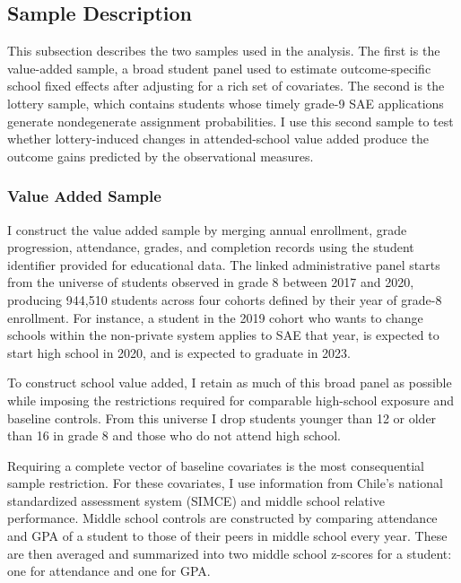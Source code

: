 \documentclass[a4paper, article, english, oneside, unknownkeysallowed, 12pt]{memoir}
\begin{document}
\subsection{Sample Description}

This subsection describes the two samples used in the analysis.
The first is the value-added sample, a broad student panel used to estimate outcome-specific school fixed effects after adjusting for a rich set of covariates.
The second is the lottery sample, which contains students whose timely grade-9 SAE applications generate nondegenerate assignment probabilities.
I use this second sample to test whether lottery-induced changes in attended-school value added produce the outcome gains predicted by the observational measures.


\subsubsection{Value Added Sample}

I construct the value added sample by merging annual enrollment, grade progression, attendance, grades, and completion records using the student identifier provided for educational data.
The linked administrative panel starts from the universe of students observed in grade 8 between 2017 and 2020, producing 944,510 students across four cohorts defined by their year of grade-8 enrollment.
For instance, a student in the 2019 cohort who wants to change schools within the non-private system applies to SAE that year, is expected to start high school in 2020, and is expected to graduate in 2023.


To construct school value added, I retain as much of this broad panel as possible while imposing the restrictions required for comparable high-school exposure and baseline controls.
From this universe I drop students younger than 12 or older than 16 in grade 8 and those who do not attend high school. 


Requiring a complete vector of baseline covariates is the most consequential sample restriction.
For these covariates, I use information from Chile's national standardized assessment system (SIMCE) and middle school relative performance.
Middle school controls are constructed by comparing attendance and GPA of a student to those of their peers in middle school every year. 
These are then averaged and summarized into two middle school z-scores for a student: one for attendance and one for GPA.
\end{document}
